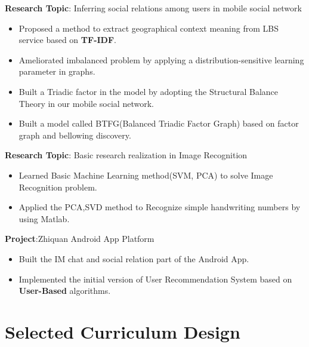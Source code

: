 \documentclass{resume}
\begin{document}
\textbf{Research Topic}: Inferring social relations among users in mobile social network
\begin{itemize}
\item  Proposed a method to extract geographical context meaning from LBS service based on \textbf{TF-IDF}.
\item Ameliorated imbalanced problem by applying a distribution-sensitive learning parameter in graphs.
\item Built a Triadic factor in the model by adopting the Structural Balance Theory in our mobile social network.
\item Built a model called BTFG(Balanced Triadic Factor Graph) based on factor graph and bellowing discovery.
\end{itemize}

\textbf{Research Topic}: Basic research realization in Image Recognition
\begin{itemize}
\item  Learned Basic Machine Learning method(SVM, PCA) to solve Image Recognition problem.
\item Applied the PCA,SVD method to Recognize simple handwriting numbers by using Matlab.
\end{itemize}




\textbf{Project}:Zhiquan Android App Platform
\begin{itemize}
\item Built the IM chat and social relation part of the Android App.
\item Implemented the initial version of User Recommendation System based on \textbf{User-Based} algorithms.
\end{itemize}

%
%
\section{Selected Curriculum Design}
\end{document}

